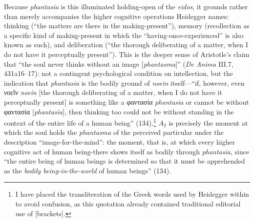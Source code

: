 \documentclass{article}
\newcommand{\gk}[1]{{\greekfont #1}}
\begin{document}
Because \textit{phantasia} is this illuminated holding-open of the \textit{eidos}, it grounds rather than merely accompanies the higher cognitive operations Heidegger names: thinking (``the matters are there in the making-present''), memory (recollection as a specific kind of making-present in which the ``having-once-experienced'' is also known as such), and deliberation (``the thorough deliberating of a matter, when I do not have it perceptually present''). This is the deeper sense of Aristotle's claim that ``the soul never thinks without an image [\textit{phantasma}]'' (\textit{De Anima} III.7, 431a16–17): not a contingent psychological condition on intellection, but the indication that \textit{phantasia} is the bodily ground of \textit{noein} itself---``if, however, even \gk{νοεῖν} {\textit{noein}} [the thorough deliberating of a matter, when I do not have it perceptually present] is something like a \gk{φαντασία} {\textit{phantasia}} or cannot be without \gk{φαντασία} [\textit{phantasia}], then thinking too could not be without standing in the context of the entire life of a human being'' (134).\footnote{I have placed the transliteration of the Greek words used by Heidegger within {} to avoid confusion, as this quotation already contained traditional editorial use of [brackets].} $A_2$ is precisely the moment at which the soul holds the \textit{phantasma} of the perceived particular under the description ``image-for-the-mind'': the moment, that is, at which every higher cognitive act of human being-there shows itself as bodily through \textit{phantasia}, since ``the entire being of human beings is determined so that it must be apprehended as the \textit{bodily being-in-the-world} of human beings'' (134).
\end{document}
